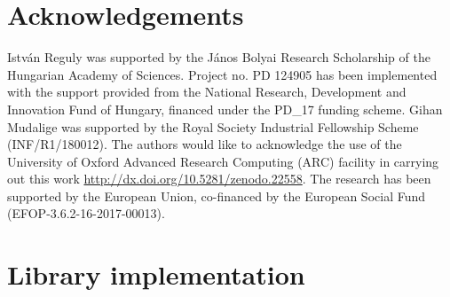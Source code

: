 \documentclass[number]{elsarticle}
\begin{document}
\section*{Acknowledgements}
\noindent Istv\'an Reguly was supported by the J\'anos Bolyai Research 
Scholarship of the Hungarian Academy of Sciences. Project no. PD 124905 has been 
implemented with the support provided from the National Research, Development 
and Innovation Fund of Hungary, financed under the PD\_17 funding scheme. Gihan 
Mudalige was supported by the Royal Society Industrial Fellowship Scheme 
(INF/R1/180012). The authors would like to acknowledge the use of the University 
of Oxford Advanced Research Computing (ARC) facility in carrying out this work 
\url{http://dx.doi.org/10.5281/zenodo.22558}. The research has been supported 
by the European Union, co-financed by the European Social Fund 
(EFOP-3.6.2-16-2017-00013).
%
%



\pagebreak
%
%
\appendix

\section{Library implementation}\label{library-implementation}



\end{document}
